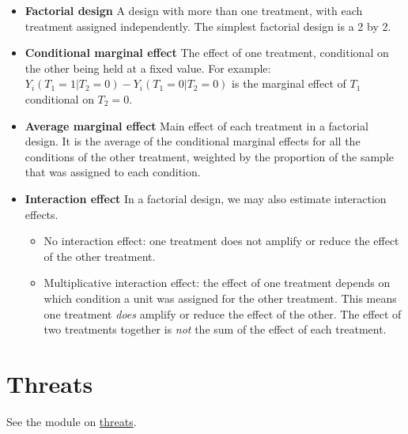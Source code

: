 \documentclass[12pt,]{book}
\providecommand{\tightlist}{%
  \setlength{\itemsep}{0pt}\setlength{\parskip}{0pt}}
\begin{document}
\begin{itemize}
\tightlist
\item
  \textbf{Factorial design} A design with more than one treatment, with each
  treatment assigned independently. The simplest factorial design is a 2 by 2.
\item
  \textbf{Conditional marginal effect} The effect of one treatment, conditional on
  the other being held at a fixed value. For example:
  \(Y_i(T_1=1|T_2=0)-Y_i(T_1=0|T_2=0)\) is the marginal effect of \(T_1\)
  conditional on \(T_2=0\).
\item
  \textbf{Average marginal effect} Main effect of each treatment in a factorial
  design. It is the average of the conditional marginal effects for all the
  conditions of the other treatment, weighted by the proportion of the sample
  that was assigned to each condition.
\item
  \textbf{Interaction effect} In a factorial design, we may also estimate
  interaction effects.

  \begin{itemize}
  \tightlist
  \item
    No interaction effect: one treatment does not amplify or reduce the
    effect of the other treatment.
  \item
    Multiplicative interaction effect: the effect of one treatment depends on which condition a unit was assigned for the other treatment. This means one treatment \emph{does} amplify or reduce the effect of the other. The effect of two treatments together is \emph{not} the sum of the effect of each treatment.
  \end{itemize}
\end{itemize}

\hypertarget{threats}{%
\section{Threats}\label{threats}}

See the module on \href{threats-to-internal-validity-of-randomized-experiments.html}{threats}.
\end{document}
